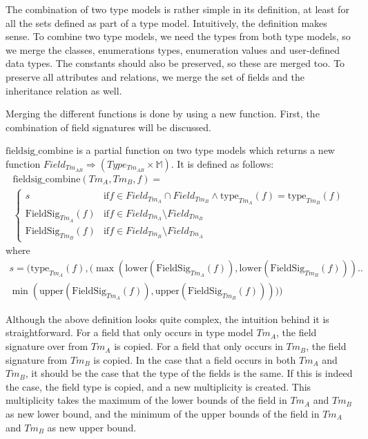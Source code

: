 The combination of two type models is rather simple in its definition, at least for all the sets defined as part of a type model. Intuitively, the definition makes sense. To combine two type models, we need the types from both type models, so we merge the classes, enumerations types, enumeration values and user-defined data types. The constants should also be preserved, so these are merged too. To preserve all attributes and relations, we merge the set of fields and the inheritance relation as well.

Merging the different functions is done by using a new function. First, the combination of field signatures will be discussed.

\begin{defin}
\label{defin:transformation_framework:type_models_and_type_graphs:combining_type_models:fieldsig_combine}
$\mathrm{fieldsig\_\!combine}$ is a partial function on two type models which returns a new function $Field_{Tm_{AB}} \Rightarrow (Type_{Tm_{AB}} \times \mathbb{M})$. It is defined as follows:
\begin{multline*}
    \mathrm{fieldsig\_\!combine}(Tm_{A}, Tm_{B}, f) = \\
        \begin{cases}
        s & \mathrm{if } f \in Field_{Tm_A} \cap Field_{Tm_B} \land \mathrm{type}_{Tm_A}(f) = \mathrm{type}_{Tm_B}(f) \\
        \mathrm{FieldSig}_{Tm_A}(f) & \mathrm{if } f \in Field_{Tm_A} \setminus Field_{Tm_B} \\
        \mathrm{FieldSig}_{Tm_B}(f) & \mathrm{if } f \in Field_{Tm_B} \setminus Field_{Tm_A}
    \end{cases}
\end{multline*}
where
\begin{equation*}
\begin{split}
    s = \bigg(\mathrm{type}_{Tm_A}(f), \Big(\max\left(\mathrm{lower}(\mathrm{FieldSig}_{Tm_A}(f)), \mathrm{lower}(\mathrm{FieldSig}_{Tm_B}(f))\right) ..\\ \min\left(\mathrm{upper}(\mathrm{FieldSig}_{Tm_A}(f)), \mathrm{upper}(\mathrm{FieldSig}_{Tm_B}(f))\right)\Big)\bigg)
\end{split}
\end{equation*}
\end{defin}

Although the above definition looks quite complex, the intuition behind it is straightforward. For a field that only occurs in type model $Tm_A$, the field signature over from $Tm_A$ is copied. For a field that only occurs in $Tm_B$, the field signature from $Tm_B$ is copied. In the case that a field occurs in both $Tm_A$ and $Tm_B$, it should be the case that the type of the fields is the same. If this is indeed the case, the field type is copied, and a new multiplicity is created. This multiplicity takes the maximum of the lower bounds of the field in $Tm_A$ and $Tm_B$ as new lower bound, and the minimum of the upper bounds of the field in $Tm_A$ and $Tm_B$ as new upper bound.

